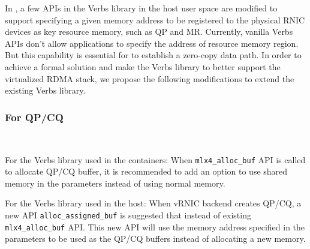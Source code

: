 

In \sys, a few APIs in the Verbs library in the host user space are modified to support specifying a given memory address to be registered to the physical RNIC devices as key resource memory, such as QP and MR. Currently, vanilla Verbs APIs don't allow applications to specify the address of resource memory region. But this capability is essential for \sys to establish a zero-copy data path.
In order to achieve a formal solution and make the Verbs library to better support the virtualized RDMA stack, we propose the following modifications to extend the existing Verbs library.


\subsubsection{\textbf{For QP/CQ}}
\
\noindent

For the Verbs library used in the containers: When \texttt{mlx4\_alloc\_buf} API is called to allocate QP/CQ buffer, it is recommended to add an option to use shared memory in the parameters instead of using normal memory.

For the Verbs library used in the host: When vRNIC backend creates QP/CQ, a new API \texttt{alloc\_assigned\_buf} is suggested that instead of existing \texttt{mlx4\_alloc\_buf} API. This new API will use the memory address specified in the parameters to be used as the QP/CQ buffers instead of allocating a new memory.


